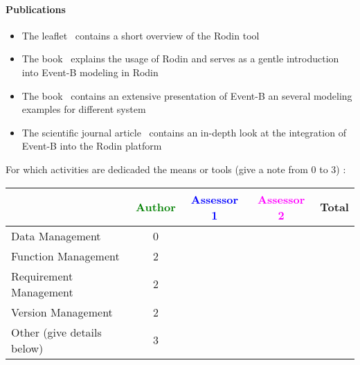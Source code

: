 \paragraph{Publications}

\begin{itemize}
\item The leaflet~\cite{RodinLeaflet} contains a short overview of the Rodin
  tool
\item The book~\cite{RodinHandbook} explains the usage of Rodin and serves as a
  gentle introduction into Event-B modeling in Rodin
\item The book~\cite{Abrial:2010:MES:1855020} contains an extensive presentation
  of Event-B an several modeling examples for different system
\item The scientific journal article~\cite{AbrialBHHMV10} contains an in-depth
  look at the integration of Event-B into the Rodin platform
\end{itemize}

For which activities are dedicaded the means or tools (give a note from 0 to  3) :

\begin{tabular}{|l | c | c | c | c|}
\hline
& \textcolor{green}{Author} & \textcolor{blue}{Assessor 1} & \textcolor{magenta}{Assessor 2} & Total \\
\hline 
Data Management & 0  & & &  \\
\hline
Function Management & 2 & & & \\
\hline
Requirement Management & 2 & & & \\
\hline
Version Management & 2 & & & \\
\hline
Other (give details below) & 3 & & & \\
\hline
\end{tabular}

